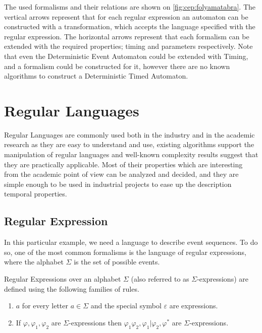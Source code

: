 	The used formalisms and their relations are shown on \cref{fig:cep:folyamatabra}.
	The vertical arrows represent that for each regular expression an automaton can be constructed with a transformation, which accepts the language specified with the regular expression.
	The horizontal arrows represent that each formalism can be extended with the required properties; timing and parameters respectively.
	Note that even the Deterministic Event Automaton could be extended with Timing, and a formalism could be constructed for it, however there are no known algorithms to construct a Deterministic Timed Automaton.
		
	\section{Regular Languages}
	
		Regular Languages are commonly used both in the industry and in the academic research as they are easy to understand and use, existing algorithms support the manipulation of regular languages and well-known complexity results suggest that they are practically applicable.
		Most of their properties which are interesting from the academic point of view can be analyzed and decided, and they are simple enough to be used in industrial projects to ease up the description temporal properties.
	
		\subsection{Regular Expression}
		
			In this particular example, we need a language to describe event sequences. To do so, one of the most common formalisms is the language of regular expressions, where the alphabet $\Sigma$ is the set of possible events.
	
			
			\begin{dfn}
				\label{dfn:cep:re}
				Regular Expressions over an alphabet $\Sigma$ (also referred to as $\Sigma$-expressions)
				are defined using the following families of rules.
				\begin{enumerate}
					\item $a$ for every letter $a \in \Sigma$ and the special symbol $\varepsilon$ are expressions.
					\item If $\varphi, \varphi_1, \varphi_2$ are $\Sigma$-expressions then %
						$ %
						\varphi_1 \varphi_2,
						\varphi_1 | \varphi_2,
						\varphi^\ast
						$ are $\Sigma$-expressions\citep{tre}.
				\end{enumerate}
			\end{dfn}
	
